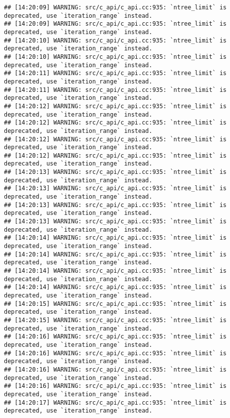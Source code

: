\documentclass[
]{article}
\begin{document}
\begin{verbatim}
## [14:20:09] WARNING: src/c_api/c_api.cc:935: `ntree_limit` is deprecated, use `iteration_range` instead.
## [14:20:09] WARNING: src/c_api/c_api.cc:935: `ntree_limit` is deprecated, use `iteration_range` instead.
## [14:20:10] WARNING: src/c_api/c_api.cc:935: `ntree_limit` is deprecated, use `iteration_range` instead.
## [14:20:10] WARNING: src/c_api/c_api.cc:935: `ntree_limit` is deprecated, use `iteration_range` instead.
## [14:20:11] WARNING: src/c_api/c_api.cc:935: `ntree_limit` is deprecated, use `iteration_range` instead.
## [14:20:11] WARNING: src/c_api/c_api.cc:935: `ntree_limit` is deprecated, use `iteration_range` instead.
## [14:20:12] WARNING: src/c_api/c_api.cc:935: `ntree_limit` is deprecated, use `iteration_range` instead.
## [14:20:12] WARNING: src/c_api/c_api.cc:935: `ntree_limit` is deprecated, use `iteration_range` instead.
## [14:20:12] WARNING: src/c_api/c_api.cc:935: `ntree_limit` is deprecated, use `iteration_range` instead.
## [14:20:12] WARNING: src/c_api/c_api.cc:935: `ntree_limit` is deprecated, use `iteration_range` instead.
## [14:20:13] WARNING: src/c_api/c_api.cc:935: `ntree_limit` is deprecated, use `iteration_range` instead.
## [14:20:13] WARNING: src/c_api/c_api.cc:935: `ntree_limit` is deprecated, use `iteration_range` instead.
## [14:20:13] WARNING: src/c_api/c_api.cc:935: `ntree_limit` is deprecated, use `iteration_range` instead.
## [14:20:13] WARNING: src/c_api/c_api.cc:935: `ntree_limit` is deprecated, use `iteration_range` instead.
## [14:20:14] WARNING: src/c_api/c_api.cc:935: `ntree_limit` is deprecated, use `iteration_range` instead.
## [14:20:14] WARNING: src/c_api/c_api.cc:935: `ntree_limit` is deprecated, use `iteration_range` instead.
## [14:20:14] WARNING: src/c_api/c_api.cc:935: `ntree_limit` is deprecated, use `iteration_range` instead.
## [14:20:14] WARNING: src/c_api/c_api.cc:935: `ntree_limit` is deprecated, use `iteration_range` instead.
## [14:20:15] WARNING: src/c_api/c_api.cc:935: `ntree_limit` is deprecated, use `iteration_range` instead.
## [14:20:15] WARNING: src/c_api/c_api.cc:935: `ntree_limit` is deprecated, use `iteration_range` instead.
## [14:20:16] WARNING: src/c_api/c_api.cc:935: `ntree_limit` is deprecated, use `iteration_range` instead.
## [14:20:16] WARNING: src/c_api/c_api.cc:935: `ntree_limit` is deprecated, use `iteration_range` instead.
## [14:20:16] WARNING: src/c_api/c_api.cc:935: `ntree_limit` is deprecated, use `iteration_range` instead.
## [14:20:16] WARNING: src/c_api/c_api.cc:935: `ntree_limit` is deprecated, use `iteration_range` instead.
## [14:20:17] WARNING: src/c_api/c_api.cc:935: `ntree_limit` is deprecated, use `iteration_range` instead.

\end{verbatim}
\end{document}
